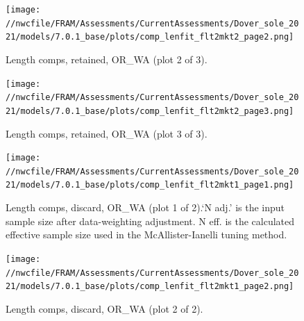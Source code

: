 \documentclass[11pt,
  english,
  a4paper,
]{article}
\begin{document}
\tagmcend\tagstructend


\begin{figure}
\centering
\texttt{[image: //nwcfile/FRAM/Assessments/CurrentAssessments/Dover\_sole\_2021/models/7.0.1\_base/plots/comp\_lenfit\_flt2mkt2\_page2.png]}
\caption{Length comps, retained, OR\_WA (plot 2 of 3).\label{fig:comp_lenfit_flt2mkt2_page2}}
\end{figure}

\tagmcend\tagstructend


\begin{figure}
\centering
\texttt{[image: //nwcfile/FRAM/Assessments/CurrentAssessments/Dover\_sole\_2021/models/7.0.1\_base/plots/comp\_lenfit\_flt2mkt2\_page3.png]}
\caption{Length comps, retained, OR\_WA (plot 3 of 3).\label{fig:comp_lenfit_flt2mkt2_page3}}
\end{figure}

\tagmcend\tagstructend


\begin{figure}
\centering
\texttt{[image: //nwcfile/FRAM/Assessments/CurrentAssessments/Dover\_sole\_2021/models/7.0.1\_base/plots/comp\_lenfit\_flt2mkt1\_page1.png]}
\caption{Length comps, discard, OR\_WA (plot 1 of 2).`N adj.' is the input sample size after data-weighting adjustment. N eff. is the calculated effective sample size used in the McAllister-Ianelli tuning method.\label{fig:comp_lenfit_flt2mkt1_page1}}
\end{figure}

\tagmcend\tagstructend


\begin{figure}
\centering
\texttt{[image: //nwcfile/FRAM/Assessments/CurrentAssessments/Dover\_sole\_2021/models/7.0.1\_base/plots/comp\_lenfit\_flt2mkt1\_page2.png]}
\caption{Length comps, discard, OR\_WA (plot 2 of 2).\label{fig:comp_lenfit_flt2mkt1_page2}}
\end{figure}
\end{document}
